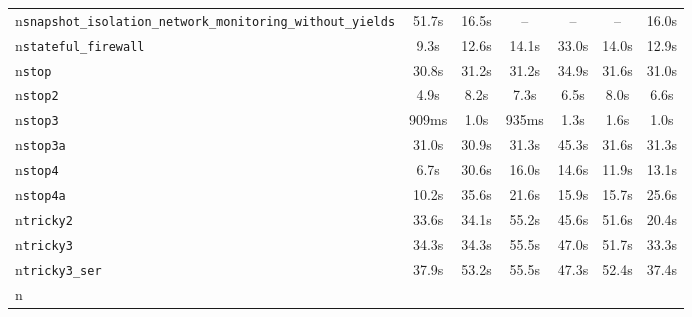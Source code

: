 \begin{tabular}{lcccccc}
\\n\texttt{snapshot\_isolation\_network\_monitoring\_without\_yields} & 51.7s & 16.5s & -- & -- & -- & 16.0s \\n\texttt{stateful\_firewall} & 9.3s & 12.6s & 14.1s & 33.0s & 14.0s & 12.9s \\n\texttt{stop} & 30.8s & 31.2s & 31.2s & 34.9s & 31.6s & 31.0s \\n\texttt{stop2} & 4.9s & 8.2s & 7.3s & 6.5s & 8.0s & 6.6s \\n\texttt{stop3} & 909ms & 1.0s & 935ms & 1.3s & 1.6s & 1.0s \\n\texttt{stop3a} & 31.0s & 30.9s & 31.3s & 45.3s & 31.6s & 31.3s \\n\texttt{stop4} & 6.7s & 30.6s & 16.0s & 14.6s & 11.9s & 13.1s \\n\texttt{stop4a} & 10.2s & 35.6s & 21.6s & 15.9s & 15.7s & 25.6s \\n\texttt{tricky2} & 33.6s & 34.1s & 55.2s & 45.6s & 51.6s & 20.4s \\n\texttt{tricky3} & 34.3s & 34.3s & 55.5s & 47.0s & 51.7s & 33.3s \\n\texttt{tricky3\_ser} & 37.9s & 53.2s & 55.5s & 47.3s & 52.4s & 37.4s \\n\bottomrule
\end{tabular}

